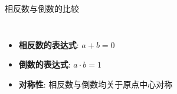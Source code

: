 \documentclass[aspectratio=169]{ctexbeamer} %
\begin{document}
\begin{frame}{相反数与倒数的比较}
\begin{columns}
\begin{itemize}
    \item \textbf{相反数的表达式}:  $a + b = 0$
    \item \textbf{倒数的表达式}:  $a \cdot b = 1$
    \item \textbf{对称性}: 相反数与倒数均关于原点中心对称
\end{itemize}

\begin{figure}
\centering
\scalebox{1.8}{}
\end{figure}
\end{columns}
\end{frame}
\end{document}
